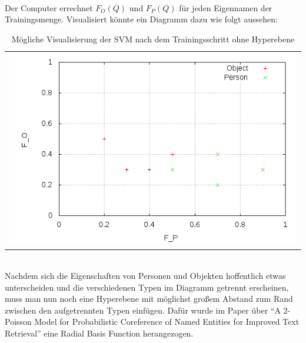 \\
Der Computer errechnet $F_O\left( Q \right)\text{ und } F_P\left( Q \right)$ für jeden Eigennamen der Trainingsmenge. Visualisiert könnte ein Diagramm dazu wie folgt aussehen:
\begin{table}[h]
	\centering
	\begin{tabular}{c}
		\includegraphics[scale=0.5]{pics/svm_training}
	\end{tabular}
	\caption{Mögliche Visualisierung der SVM nach dem Trainingsschritt ohne Hyperebene}
	\label{tab:svm_training}
\end{table}\\
Nachdem sich die Eigenschaften von Personen und Objekten hoffentlich etwas unterscheiden und die verschiedenen Typen im Diagramm getrennt erscheinen, muss man nun noch eine Hyperebene mit möglichst großem Abstand zum Rand zwischen den aufgetrennten Typen einfügen. Dafür wurde im Paper über ``A 2-Poisson Model for Probabilistic Coreference of Named Entities for Improved Text Retrieval'' \cite{paper:Na} eine Radial Basis Function herangezogen. 

